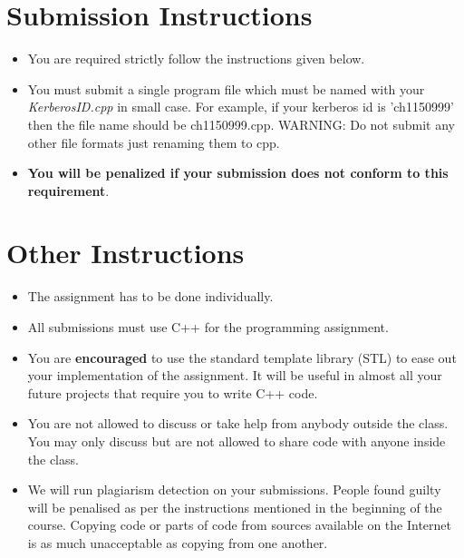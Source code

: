 \documentclass[20pt]{article}
\begin{document}
\section{Submission Instructions}
\begin{itemize}
\item You are required strictly follow the instructions given below.
\item You must submit a single program file which must be named with your \textit{KerberosID.cpp} in small case. For example, if your kerberos id is ’ch1150999’ then the file name should be ch1150999.cpp. WARNING: Do not submit any other file formats just renaming them to cpp.
\item \textbf{You will be penalized if your submission does not conform to this requirement}.
\end{itemize}

\section{Other Instructions}
\begin{itemize}
\item The assignment has to be done individually.
\item All submissions must use C++ for the programming assignment.
\item You are \textbf{encouraged} to use the standard template library (STL) to ease out your implementation of the assignment. It will be useful in almost all your future projects that require you to write C++ code.
\item You are not allowed to discuss or take help from anybody outside the class. You may only discuss but are not allowed to share code with anyone inside the class.
\item We will run plagiarism detection on your submissions. People found guilty will be penalised as per the instructions mentioned in the beginning of the course. Copying code or parts of code from sources available on the Internet is as much unacceptable as copying from one another.
\end{itemize}
\end{document}
